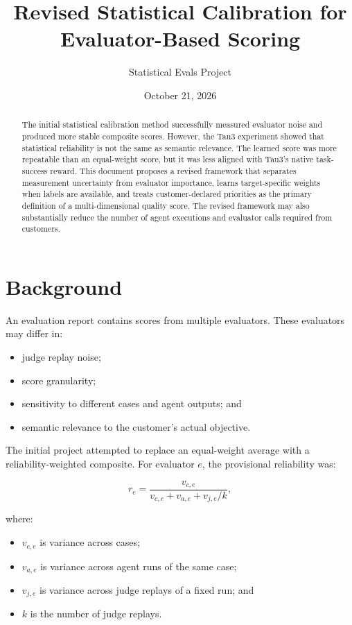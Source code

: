 \documentclass[11pt]{article}
\title{Revised Statistical Calibration for Evaluator-Based Scoring}
\author{Statistical Evals Project}
\date{October 21, 2026}
\begin{document}
\maketitle

\begin{abstract}
The initial statistical calibration method successfully measured evaluator
noise and produced more stable composite scores. However, the Tau3 experiment
showed that statistical reliability is not the same as semantic relevance.
The learned score was more repeatable than an equal-weight score, but it was
less aligned with Tau3's native task-success reward. This document proposes a
revised framework that separates measurement uncertainty from evaluator
importance, learns target-specific weights when labels are available, and
treats customer-declared priorities as the primary definition of a
multi-dimensional quality score. The revised framework may also substantially
reduce the number of agent executions and evaluator calls required from
customers.
\end{abstract}

\section{Background}

An evaluation report contains scores from multiple evaluators. These
evaluators may differ in:

\begin{itemize}
    \item judge replay noise;
    \item score granularity;
    \item sensitivity to different cases and agent outputs; and
    \item semantic relevance to the customer's actual objective.
\end{itemize}

The initial project attempted to replace an equal-weight average with a
reliability-weighted composite. For evaluator \(e\), the provisional
reliability was:

\begin{equation}
r_e =
\frac{v_{c,e}}
     {v_{c,e} + v_{a,e} + v_{j,e}/k},
\end{equation}

where:

\begin{itemize}
    \item \(v_{c,e}\) is variance across cases;
    \item \(v_{a,e}\) is variance across agent runs of the same case;
    \item \(v_{j,e}\) is variance across judge replays of a fixed run; and
    \item \(k\) is the number of judge replays.
\end{itemize}
\end{document}
